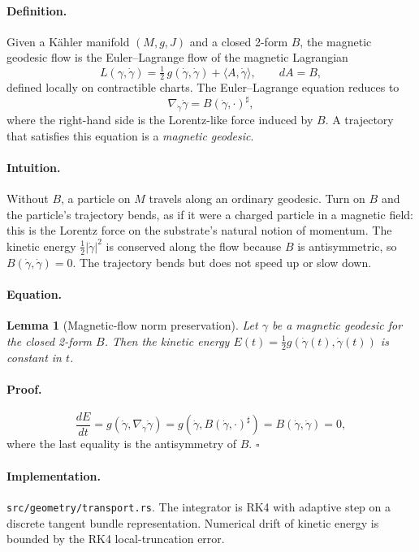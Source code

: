 \documentclass[11pt,letterpaper]{article}
\newtheorem{lemma}[theorem]{Lemma}
\begin{document}
\paragraph{Definition.}
Given a K\"ahler manifold $(M, g, J)$ and a closed 2-form $B$, the
magnetic geodesic flow is the Euler--Lagrange flow of the magnetic
Lagrangian
\[
L(\gamma, \dot\gamma) = \tfrac{1}{2} \, g(\dot\gamma, \dot\gamma)
+ \langle A, \dot\gamma \rangle, \qquad dA = B,
\]
defined locally on contractible charts. The Euler--Lagrange
equation reduces to
\[
\nabla_{\dot\gamma} \dot\gamma = B(\dot\gamma, \cdot)^\sharp,
\]
where the right-hand side is the Lorentz-like force induced by $B$.
A trajectory that satisfies this equation is a \emph{magnetic
geodesic}.

\paragraph{Intuition.}
Without $B$, a particle on $M$ travels along an ordinary geodesic.
Turn on $B$ and the particle's trajectory bends, as if it were a
charged particle in a magnetic field: this is the Lorentz force on
the substrate's natural notion of momentum. The kinetic energy
$\tfrac{1}{2} |\dot\gamma|^2$ is conserved along the flow because
$B$ is antisymmetric, so $B(\dot\gamma, \dot\gamma) = 0$. The
trajectory bends but does not speed up or slow down.

\paragraph{Equation.}
\begin{lemma}[Magnetic-flow norm preservation]
\label{lem:norm-preservation}
Let $\gamma$ be a magnetic geodesic for the closed 2-form $B$. Then
the kinetic energy $E(t) = \tfrac{1}{2} g(\dot\gamma(t),
\dot\gamma(t))$ is constant in $t$.
\end{lemma}

\paragraph{Proof.}
\[
\frac{dE}{dt}
= g(\dot\gamma, \nabla_{\dot\gamma} \dot\gamma)
= g(\dot\gamma, B(\dot\gamma, \cdot)^\sharp)
= B(\dot\gamma, \dot\gamma)
= 0,
\]
where the last equality is the antisymmetry of $B$. \hfill$\square$

\paragraph{Implementation.}
\texttt{src/geometry/transport.rs}. The
integrator is RK4 with adaptive step on a discrete tangent bundle
representation. Numerical drift of kinetic energy is bounded by the
RK4 local-truncation error.
\end{document}

